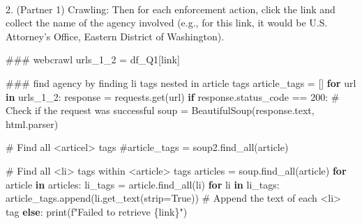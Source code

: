 \documentclass[
  letterpaper,
  DIV=11,
  numbers=noendperiod]{scrartcl}
\makeatletter
\let\oldparagraph\paragraph
\renewcommand{\paragraph}{
    \@ifstar
      \xxxParagraphStar
      \xxxParagraphNoStar
  }
\newcommand{\xxxParagraphStar}[1]{\oldparagraph*{#1}\mbox{}}
\newcommand{\xxxParagraphNoStar}[1]{\oldparagraph{#1}\mbox{}}
\newenvironment{Shaded}{\begin{snugshade}}{\end{snugshade}}
\newcommand{\BuiltInTok}[1]{\textcolor[rgb]{0.00,0.23,0.31}{#1}}
\newcommand{\CommentTok}[1]{\textcolor[rgb]{0.37,0.37,0.37}{#1}}
\newcommand{\ControlFlowTok}[1]{\textcolor[rgb]{0.00,0.23,0.31}{\textbf{#1}}}
\newcommand{\DecValTok}[1]{\textcolor[rgb]{0.68,0.00,0.00}{#1}}
\newcommand{\KeywordTok}[1]{\textcolor[rgb]{0.00,0.23,0.31}{\textbf{#1}}}
\newcommand{\NormalTok}[1]{\textcolor[rgb]{0.00,0.23,0.31}{#1}}
\newcommand{\OperatorTok}[1]{\textcolor[rgb]{0.37,0.37,0.37}{#1}}
\newcommand{\SpecialCharTok}[1]{\textcolor[rgb]{0.37,0.37,0.37}{#1}}
\newcommand{\SpecialStringTok}[1]{\textcolor[rgb]{0.13,0.47,0.30}{#1}}
\newcommand{\StringTok}[1]{\textcolor[rgb]{0.13,0.47,0.30}{#1}}
\newcommand{\VariableTok}[1]{\textcolor[rgb]{0.07,0.07,0.07}{#1}}
\makeatother
\begin{document}
\paragraph{2. (Partner 1) Crawling: Then for each enforcement action,
click the link and collect the name of the agency involved (e.g., for
this link, it would be U.S. Attorney's Office, Eastern District of
Washington).}\label{partner-1-crawling-then-for-each-enforcement-action-click-the-link-and-collect-the-name-of-the-agency-involved-e.g.-for-this-link-it-would-be-u.s.-attorneys-office-eastern-district-of-washington.}

\begin{Shaded}
\begin{Highlighting}[]
\CommentTok{\#\#\# webcrawl}
\NormalTok{urls\_1\_2 }\OperatorTok{=}\NormalTok{ df\_Q1[}\StringTok{\textquotesingle{}link\textquotesingle{}}\NormalTok{]}

\CommentTok{\#\#\# find agency by finding \textquotesingle{}li\textquotesingle{} tags nested in \textquotesingle{}article\textquotesingle{} tags}
\NormalTok{article\_tags }\OperatorTok{=}\NormalTok{ []}
\ControlFlowTok{for}\NormalTok{ url }\KeywordTok{in}\NormalTok{ urls\_1\_2:}
\NormalTok{    response }\OperatorTok{=}\NormalTok{ requests.get(url)}
    \ControlFlowTok{if}\NormalTok{ response.status\_code }\OperatorTok{==} \DecValTok{200}\NormalTok{:  }\CommentTok{\# Check if the request was successful}
\NormalTok{        soup }\OperatorTok{=}\NormalTok{ BeautifulSoup(response.text, }\StringTok{\textquotesingle{}html.parser\textquotesingle{}}\NormalTok{)}
        
        \CommentTok{\# Find all \textless{}articel\textgreater{} tags}
        \CommentTok{\#article\_tags = soup2.find\_all(\textquotesingle{}article\textquotesingle{})}
        
        \CommentTok{\# Find all \textless{}li\textgreater{} tags within \textless{}article\textgreater{} tags}
\NormalTok{        articles }\OperatorTok{=}\NormalTok{ soup.find\_all(}\StringTok{\textquotesingle{}article\textquotesingle{}}\NormalTok{)}
        \ControlFlowTok{for}\NormalTok{ article }\KeywordTok{in}\NormalTok{ articles:}
\NormalTok{            li\_tags }\OperatorTok{=}\NormalTok{ article.find\_all(}\StringTok{\textquotesingle{}li\textquotesingle{}}\NormalTok{)}
            \ControlFlowTok{for}\NormalTok{ li }\KeywordTok{in}\NormalTok{ li\_tags:}
\NormalTok{                article\_tags.append(li.get\_text(strip}\OperatorTok{=}\VariableTok{True}\NormalTok{))  }\CommentTok{\# Append the text of each \textless{}li\textgreater{} tag}
    \ControlFlowTok{else}\NormalTok{:}
        \BuiltInTok{print}\NormalTok{(}\SpecialStringTok{f"Failed to retrieve }\SpecialCharTok{\{}\NormalTok{link}\SpecialCharTok{\}}\SpecialStringTok{"}\NormalTok{)}


\end{Highlighting}
\end{Shaded}
\end{document}

